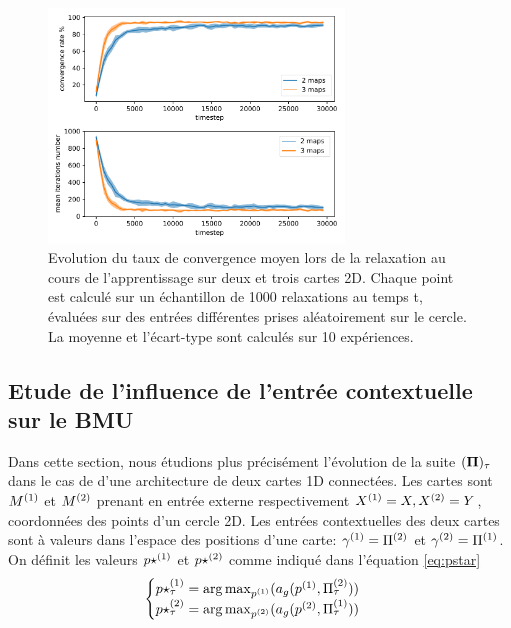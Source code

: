 \begin{figure}
\centering
\includegraphics[width=0.7\textwidth]{2D_conv_evolution_total.pdf}
\caption{Evolution du taux de convergence moyen lors de la relaxation au cours de l'apprentissage sur deux et trois cartes 2D. Chaque point est calculé sur un échantillon de 1000 relaxations au temps t, évaluées sur des entrées différentes prises aléatoirement sur le cercle. La moyenne et l'écart-type sont calculés sur 10 expériences.}
\label{fig:conv_evolution2D}
\end{figure}

\subsection{Etude de l'influence de l'entrée contextuelle sur le BMU}\label{sec:cont}

Dans cette section, nous étudions plus précisément l'évolution de la suite $(\mathbf{\Pi})_{\tau}$ dans le cas de d'une architecture de deux cartes 1D connectées. Les cartes sont $M^{({1})}$ et $M^{({2})}$ prenant en entrée externe respectivement $X^{({1})} = X, X^{({2})} = Y$, coordonnées des points d'un cercle 2D.
Les entrées contextuelles des deux cartes sont à valeurs dans l'espace des positions d'une carte: $\gamma^{({1})} = \Pi^{({2})}$ et $\gamma^{({2})} = \Pi^{({1})}$.
On définit les valeurs $p\star^{({1})}$ et $p\star^{({2})}$ comme indiqué dans l'équation \ref{eq:pstar}
\begin{equation} 
\begin{cases}
	p\star^{({1})}_{\tau} = \operatorname*{arg\,max}_{p^{({1})}}(a_g(p^{({1})},\Pi^{({2})}_{\tau})) \\
	p\star^{({2})}_{\tau} = \operatorname*{arg\,max}_{p^{({2})}}(a_g(p^{({2})},\Pi^{({1})}_{\tau})) \\
\end{cases}
\end{equation}

